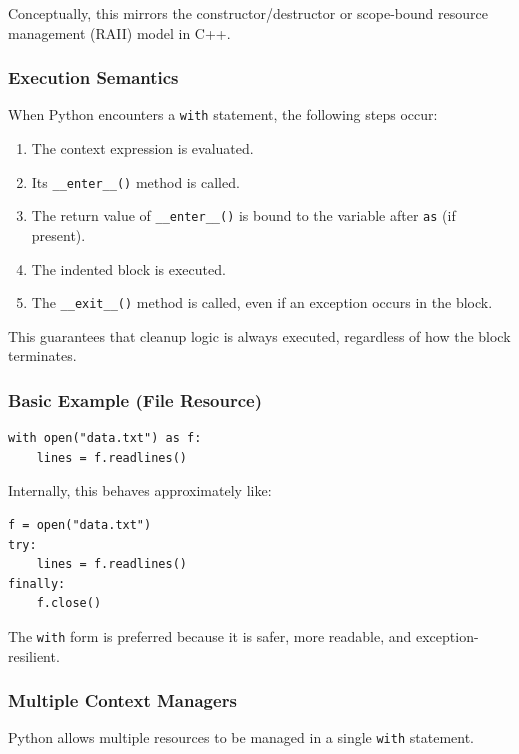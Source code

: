 Conceptually, this mirrors the constructor/destructor or scope-bound resource management (RAII) model in C++.

\subsubsection{Execution Semantics}

When Python encounters a \texttt{with} statement, the following steps occur:

\begin{enumerate}
  \item The context expression is evaluated.
  \item Its \texttt{\_\_enter\_\_()} method is called.
  \item The return value of \texttt{\_\_enter\_\_()} is bound to the variable after \texttt{as} (if present).
  \item The indented block is executed.
  \item The \texttt{\_\_exit\_\_()} method is called, even if an exception occurs in the block.
\end{enumerate}

This guarantees that cleanup logic is always executed, regardless of how the block terminates.

\subsubsection{Basic Example (File Resource)}

\begin{verbatim}
with open("data.txt") as f:
    lines = f.readlines()
\end{verbatim}

Internally, this behaves approximately like:

\begin{verbatim}
f = open("data.txt")
try:
    lines = f.readlines()
finally:
    f.close()
\end{verbatim}

The \texttt{with} form is preferred because it is safer, more readable, and exception-resilient.

\subsubsection{Multiple Context Managers}

Python allows multiple resources to be managed in a single \texttt{with} statement.

